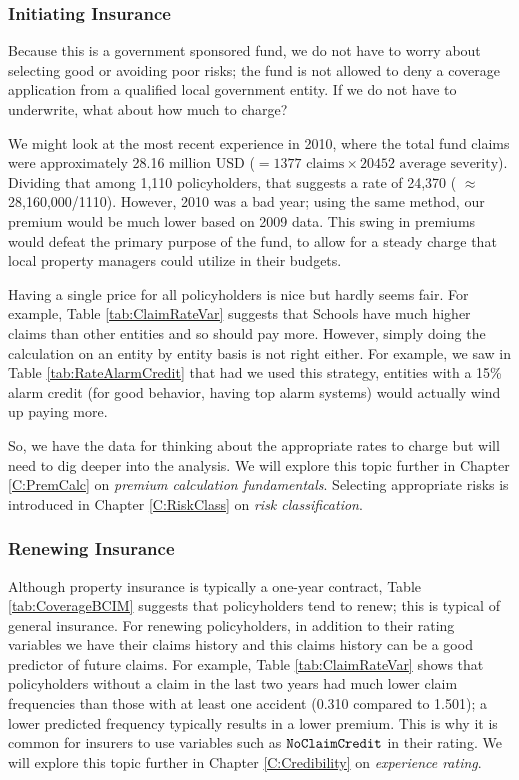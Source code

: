\documentclass[]{book}
\theoremstyle{definition}
\theoremstyle{definition}
\theoremstyle{definition}
\theoremstyle{remark}
\begin{document}
\subsubsection*{Initiating Insurance}\label{initiating-insurance-1}

Because this is a government sponsored fund, we do not have to worry
about selecting good or avoiding poor risks; the fund is not allowed to
deny a coverage application from a qualified local government entity. If
we do not have to underwrite, what about how much to charge?

We might look at the most recent experience in 2010, where the total
fund claims were approximately 28.16 million USD
(\(=1377 \text{ claims} \times 20452 \text{ average severity}\)).
Dividing that among 1,110 policyholders, that suggests a rate of 24,370
( \(\approx\) 28,160,000/1110). However, 2010 was a bad year; using the
same method, our premium would be much lower based on 2009 data. This
swing in premiums would defeat the primary purpose of the fund, to allow
for a steady charge that local property managers could utilize in their
budgets.

Having a single price for all policyholders is nice but hardly seems
fair. For example, Table \ref{tab:ClaimRateVar} suggests that Schools
have much higher claims than other entities and so should pay more.
However, simply doing the calculation on an entity by entity basis is
not right either. For example, we saw in Table \ref{tab:RateAlarmCredit}
that had we used this strategy, entities with a 15\% alarm credit (for
good behavior, having top alarm systems) would actually wind up paying
more.

So, we have the data for thinking about the appropriate rates to charge
but will need to dig deeper into the analysis. We will explore this
topic further in Chapter \ref{C:PremCalc} on \emph{premium calculation
fundamentals}. Selecting appropriate risks is introduced in Chapter
\ref{C:RiskClass} on \emph{risk classification}.

\subsubsection*{Renewing Insurance}\label{renewing-insurance-1}

Although property insurance is typically a one-year contract, Table
\ref{tab:CoverageBCIM} suggests that policyholders tend to renew; this
is typical of general insurance. For renewing policyholders, in addition
to their rating variables we have their claims history and this claims
history can be a good predictor of future claims. For example, Table
\ref{tab:ClaimRateVar} shows that policyholders without a claim in the
last two years had much lower claim frequencies than those with at least
one accident (0.310 compared to 1.501); a lower predicted frequency
typically results in a lower premium. This is why it is common for
insurers to use variables such as \({\tt NoClaimCredit}\) in their
rating. We will explore this topic further in Chapter
\ref{C:Credibility} on \emph{experience rating}.
\end{document}
